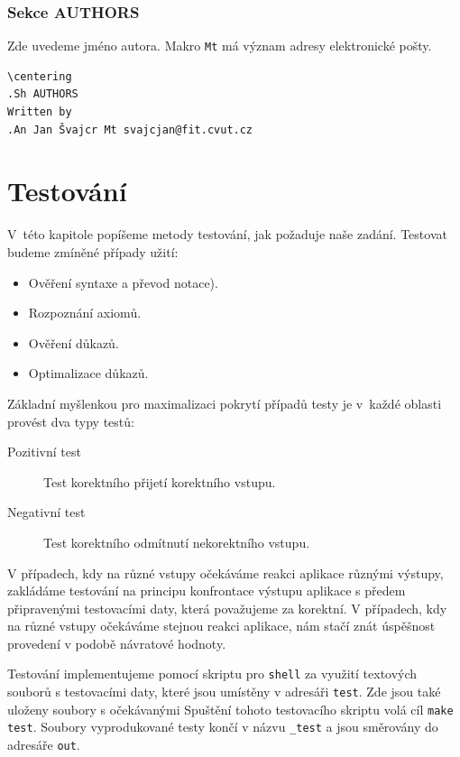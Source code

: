 \documentclass[thesis=B,czech,hidelinks]{thesis}[2012/06/26]
\begin{document}
\subsection{Sekce AUTHORS}

Zde uvedeme jméno autora. Makro \texttt{Mt} má význam adresy elektronické pošty.

\begin{verbatim}
\centering
.Sh AUTHORS
Written by
.An Jan Švajcr Mt svajcjan@fit.cvut.cz
\end{verbatim}

%
%
%

\chapter{Testování}

V~této kapitole popíšeme metody testování, jak požaduje naše zadání. Testovat budeme zmíněné případy užití:

\begin{itemize}
	\item Ověření syntaxe a převod notace).
	\item Rozpoznání axiomů.
	\item Ověření důkazů.
	\item Optimalizace důkazů.
\end{itemize}

Základní myšlenkou pro maximalizaci pokrytí případů testy je v~každé oblasti provést dva typy testů:

\begin{description}
	\item[Pozitivní test] Test korektního přijetí korektního vstupu.
	\item[Negativní test] Test korektního odmítnutí nekorektního vstupu.
\end{description}

V případech, kdy na různé vstupy očekáváme reakci aplikace různými výstupy, zakládáme testování na principu konfrontace výstupu aplikace s předem připravenými testovacími daty, která považujeme za korektní. V případech, kdy na různé vstupy očekáváme stejnou reakci aplikace, nám stačí znát úspěšnost provedení v podobě návratové hodnoty.

Testování implementujeme pomocí skriptu pro \texttt{shell} za využití textových souborů s testovacími daty, které jsou umístěny v adresáři \texttt{test}. Zde jsou také uloženy soubory s očekávanými  Spuštění tohoto testovacího skriptu volá cíl \texttt{make test}. Soubory vyprodukované testy končí v názvu \texttt{\_test} a jsou směrovány do adresáře \texttt{out}.
\end{document}
